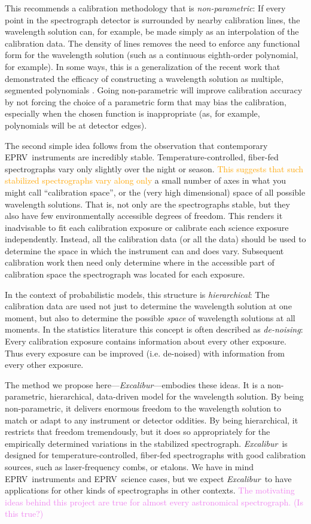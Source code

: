 \documentclass[modern]{aastex63}
\newcommand{\project}[1]{\textsl{#1}}
\newcommand{\name}{\project{Excalibur}}
\newcommand{\acronym}[1]{{\small{#1}}}
\newcommand{\eprv}{\acronym{EPRV}}
\newcommand{\lz}[1]{\textcolor{orange}{#1}}
\newcommand{\mb}[1]{\textcolor{violet}{#1}}
\begin{document}
This recommends a calibration methodology that is \emph{non-parametric}:  If every point in the spectrograph detector is surrounded by nearby calibration lines, the wavelength solution can, for example, be made simply as an interpolation of the calibration data.  The density of lines removes the need to enforce any functional form for the wavelength solution (such as a continuous eighth-order polynomial, for example).  In some ways, this is a generalization of the recent work that demonstrated the efficacy of constructing a wavelength solution as multiple, segmented polynomials \citep{milakovic2020}.  Going non-parametric will improve calibration accuracy by not forcing the choice of a parametric form that may bias the calibration, especially when the chosen function is inappropriate (as, for example, polynomials will be at detector edges).

The second simple idea follows from the observation that contemporary \eprv\ instruments are incredibly stable.  Temperature-controlled, fiber-fed spectrographs vary only slightly over the night or season.  \lz{This suggests that such stabilized spectrographs vary along only} a small number of axes in what you might call ``calibration space'', or the (very high dimensional) space of all possible wavelength solutions.  That is, not only are the spectrographs stable, but they also have few environmentally accessible degrees of freedom.  This renders it inadvisable to fit each calibration exposure or calibrate each science exposure independently.  Instead, all the calibration data (or all the data) should be used to determine the space in which the instrument can and does vary.  Subsequent calibration work then need only determine where in the accessible part of calibration space the spectrograph was located for each exposure.

In the context of probabilistic models, this structure is \emph{hierarchical}:  The calibration data are used not just to determine the wavelength solution at one moment, but also to determine the possible \emph{space} of wavelength solutions at all moments.  In the statistics literature this concept is often described as \emph{de-noising}:  Every calibration exposure contains information about every other exposure.  Thus every exposure can be improved (i.e. de-noised) with information from every other exposure.

The method we propose here---\name---embodies these ideas.
It is a non-parametric, hierarchical, data-driven model for the wavelength solution.  By being non-parametric, it delivers enormous freedom to the wavelength solution to match or adapt to any instrument or detector oddities.  By being hierarchical, it restricts that freedom tremendously, but it does so appropriately for the empirically determined variations in the stabilized spectrograph.  \name\ is designed for temperature-controlled, fiber-fed spectrographs with good calibration sources, such as laser-frequency combs, or etalons.  We have in mind \eprv\ instruments and \eprv\ science cases, but we expect \name\ to have applications for other kinds of spectrographs in other contexts.  \mb{The motivating ideas behind this project are true for almost every astronomical spectrograph. (Is this true?)}
\end{document}
